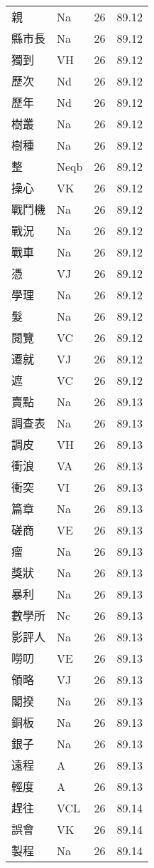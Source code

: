 \documentclass[twocolumn]{book}
\begin{document}
\begin{supertabular}{llrr}
親 & Na & 26 &  89.12\\
縣市長 & Na & 26 &  89.12\\
獨到 & VH & 26 &  89.12\\
歷次 & Nd & 26 &  89.12\\
歷年 & Nd & 26 &  89.12\\
樹叢 & Na & 26 &  89.12\\
樹種 & Na & 26 &  89.12\\
整 & Neqb & 26 &  89.12\\
操心 & VK & 26 &  89.12\\
戰鬥機 & Na & 26 &  89.12\\
戰況 & Na & 26 &  89.12\\
戰車 & Na & 26 &  89.12\\
憑 & VJ & 26 &  89.12\\
學理 & Na & 26 &  89.12\\
髮 & Na & 26 &  89.12\\
閱覽 & VC & 26 &  89.12\\
遷就 & VJ & 26 &  89.12\\
遮 & VC & 26 &  89.12\\
賣點 & Na & 26 &  89.13\\
調查表 & Na & 26 &  89.13\\
調皮 & VH & 26 &  89.13\\
衝浪 & VA & 26 &  89.13\\
衝突 & VI & 26 &  89.13\\
篇章 & Na & 26 &  89.13\\
磋商 & VE & 26 &  89.13\\
瘤 & Na & 26 &  89.13\\
獎狀 & Na & 26 &  89.13\\
暴利 & Na & 26 &  89.13\\
數學所 & Nc & 26 &  89.13\\
影評人 & Na & 26 &  89.13\\
嘮叨 & VE & 26 &  89.13\\
領略 & VJ & 26 &  89.13\\
閣揆 & Na & 26 &  89.13\\
銅板 & Na & 26 &  89.13\\
銀子 & Na & 26 &  89.13\\
遠程 & A & 26 &  89.13\\
輕度 & A & 26 &  89.13\\
趕往 & VCL & 26 &  89.14\\
誤會 & VK & 26 &  89.14\\
製程 & Na & 26 &  89.14\\

\end{supertabular}
\end{document}
